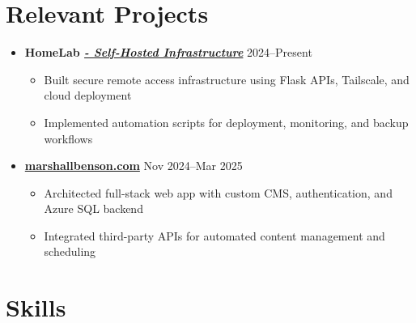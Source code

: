 \documentclass[letterpaper,10pt]{article}
\newcommand{\resumeItem}[1]{\item \small{#1}}
\begin{document}
\section*{Relevant Projects}
\begin{itemize}
  \item[]
    \textbf{HomeLab \href{https://mig.is-a.dev}{\textit{- Self-Hosted Infrastructure}}} \hfill 2024–Present
    \begin{itemize}[leftmargin=0.15in]
      \resumeItem{Built secure remote access infrastructure using Flask APIs, Tailscale, and cloud deployment}
      \resumeItem{Implemented automation scripts for deployment, monitoring, and backup workflows}
    \end{itemize}

  \item[]
    \textbf{\href{https://marshallbenson.com}{marshallbenson.com}} \href{https://marshallbenson.com}{\hfill} Nov 2024–Mar 2025
    \begin{itemize}[leftmargin=0.15in]
      \resumeItem{Architected full-stack web app with custom CMS, authentication, and Azure SQL backend}
      \resumeItem{Integrated third-party APIs for automated content management and scheduling}
    \end{itemize}
\end{itemize}

\section*{Skills}

\end{document}
